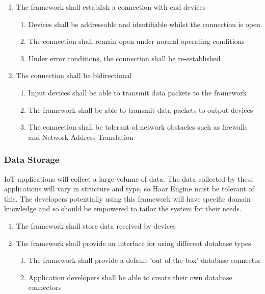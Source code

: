         \begin{enumerate}
          \item The framework shall establish a connection with end devices
          \begin{enumerate}
            \item Devices shall be addressable and identifiable whilst the connection is open
            \item The connection shall remain open under normal operating conditions
            \item Under error conditions, the connection shall be re-established
          \end{enumerate}
          \item The connection shall be bidirectional
          \begin{enumerate}
            \item Input devices shall be able to transmit data packets to the framework
            \item The framework shall be able to transmit data packets to output devices
            \item The connection shall be tolerant of network obstacles such as firewalls and Network Address Translation
          \end{enumerate}
        \end{enumerate}

      \subsubsection{Data Storage}
        IoT applications will collect a large volume of data. The data collected by these applications will vary in structure and type, so Haar Engine must be tolerant of this. The developers potentially using this framework will have specific domain knowledge and so should be empowered to tailor the system for their needs.

        \begin{enumerate}
          \item The framework shall store data received by devices
          \item The framework shall provide an interface for using different database types
          \begin{enumerate}
            \item The framework shall provide a default `out of the box' database connector
            \item Application developers shall be able to create their own database connectors
          \end{enumerate}
        \end{enumerate}

